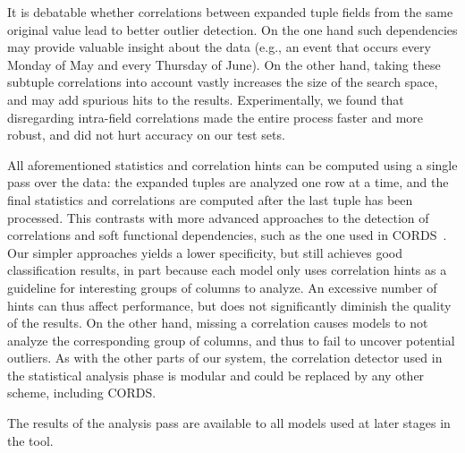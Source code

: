 It is debatable whether correlations between expanded tuple fields from the same original value lead to better outlier detection. On the one hand such dependencies may provide valuable insight about the data (e.g., an event that occurs every Monday of May and every Thursday of June). On the other hand, taking these subtuple correlations into account vastly increases the size of the search space, and may add spurious hits to the results. Experimentally, we found that disregarding intra-field correlations made the entire process faster and more robust, and did not hurt accuracy on our test sets.

All aforementioned statistics and correlation hints can be computed using a single pass over the data: the expanded tuples are analyzed one row at a time, and the final statistics and correlations are computed after the last tuple has been processed. This contrasts with more advanced approaches to the detection of correlations and soft functional dependencies, such as the one used in CORDS~\cite{Ilyas2004}. Our simpler approaches yields a lower specificity, but still achieves good classification results, in part because each model only uses correlation hints as a guideline for interesting groups of columns to analyze. An excessive number of hints can thus affect performance, but does not significantly diminish the quality of the results. On the other hand, missing a correlation causes models to not analyze the corresponding group of columns, and thus to fail to uncover potential outliers. As with the other parts of our system, the correlation detector used in the statistical analysis phase is modular and could be replaced by any other scheme, including CORDS.

The results of the analysis pass are available to all models used at later stages in the tool.
